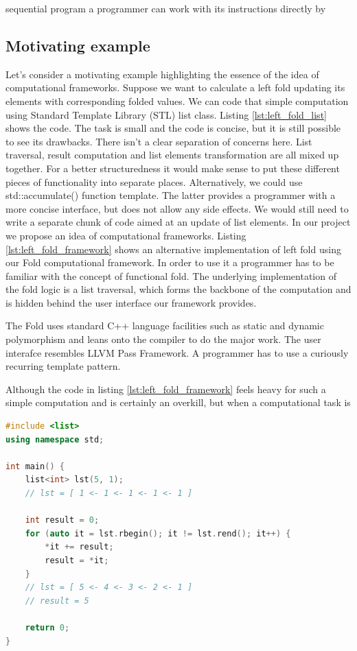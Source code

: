 sequential program a programmer can work with its instructions directly by 

\subsection{Motivating example}
\quad Let's consider a motivating example highlighting the essence of the idea of computational frameworks. Suppose we want to calculate a left fold updating its elements with corresponding folded values. We can code that simple computation using Standard Template Library (STL) list class. Listing \ref{lst:left_fold_list} shows the code. The task is small and the code is concise, but it is still possible to see its drawbacks. There isn't a clear separation of concerns here. List traversal, result computation and list elements transformation are all mixed up together. For a better structuredness it would make sense to put these different pieces of functionality into separate places. Alternatively, we could use std::accumulate() function template. The latter provides a programmer with a more concise interface, but does not allow any side effects. We would still need to write a separate chunk of code aimed at an update of list elements.\newline 
\quad In our project we propose an idea of computational frameworks. Listing \ref{lst:left_fold_framework} shows an alternative implementation of left fold using our Fold computational framework. In order to use it a programmer has to be familiar with the concept of functional fold. The underlying implementation of the fold logic is a list traversal, which forms the backbone of the computation and is hidden behind the user interface our framework provides. 

The Fold uses standard C++ language facilities such as static and dynamic polymorphism and leans onto the compiler to do the major work. The user interafce resembles LLVM Pass Framework. A programmer has to use a curiously recurring template pattern.

\quad Although the code in listing \ref{lst:left_fold_framework} feels heavy for such a simple computation and is certainly an overkill, but when a computational task is 




\begin{minipage}[t]{\linewidth}
\begin{lstlisting}[caption={Left fold computation using standard STL list class template},label={lst:left_fold_list},language=C++]
#include <list>
using namespace std;

int main() {
    list<int> lst(5, 1);
    // lst = [ 1 <- 1 <- 1 <- 1 <- 1 ]
    
    int result = 0;
    for (auto it = lst.rbegin(); it != lst.rend(); it++) {
        *it += result;
        result = *it;
    }
    // lst = [ 5 <- 4 <- 3 <- 2 <- 1 ]
    // result = 5
    
    return 0;
}
\end{lstlisting}
\end{minipage}


